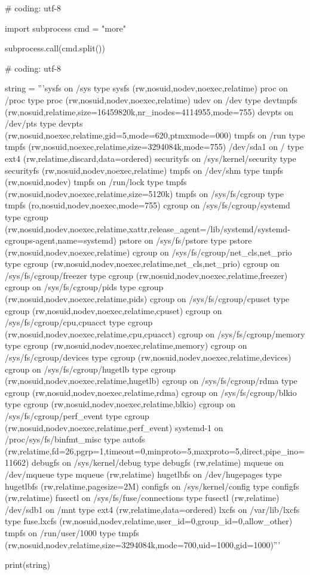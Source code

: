 \begin{mylisting}[label={lst:acpid},language=sh,caption=more]

# coding: utf-8

import subprocess
cmd = "more"

subprocess.call(cmd.split())

\end{mylisting}

\begin{mylisting}[label={lst:mount},language=sh,caption=mountコマンド]
# coding: utf-8

string = '''sysfs on /sys type sysfs (rw,nosuid,nodev,noexec,relatime)
proc on /proc type proc (rw,nosuid,nodev,noexec,relatime)
udev on /dev type devtmpfs (rw,nosuid,relatime,size=16459820k,nr_inodes=4114955,mode=755)
devpts on /dev/pts type devpts (rw,nosuid,noexec,relatime,gid=5,mode=620,ptmxmode=000)
tmpfs on /run type tmpfs (rw,nosuid,noexec,relatime,size=3294084k,mode=755)
/dev/sda1 on / type ext4 (rw,relatime,discard,data=ordered)
securityfs on /sys/kernel/security type securityfs (rw,nosuid,nodev,noexec,relatime)
tmpfs on /dev/shm type tmpfs (rw,nosuid,nodev)
tmpfs on /run/lock type tmpfs (rw,nosuid,nodev,noexec,relatime,size=5120k)
tmpfs on /sys/fs/cgroup type tmpfs (ro,nosuid,nodev,noexec,mode=755)
cgroup on /sys/fs/cgroup/systemd type cgroup (rw,nosuid,nodev,noexec,relatime,xattr,release_agent=/lib/systemd/systemd-cgroups-agent,name=systemd)
pstore on /sys/fs/pstore type pstore (rw,nosuid,nodev,noexec,relatime)
cgroup on /sys/fs/cgroup/net_cls,net_prio type cgroup (rw,nosuid,nodev,noexec,relatime,net_cls,net_prio)
cgroup on /sys/fs/cgroup/freezer type cgroup (rw,nosuid,nodev,noexec,relatime,freezer)
cgroup on /sys/fs/cgroup/pids type cgroup (rw,nosuid,nodev,noexec,relatime,pids)
cgroup on /sys/fs/cgroup/cpuset type cgroup (rw,nosuid,nodev,noexec,relatime,cpuset)
cgroup on /sys/fs/cgroup/cpu,cpuacct type cgroup (rw,nosuid,nodev,noexec,relatime,cpu,cpuacct)
cgroup on /sys/fs/cgroup/memory type cgroup (rw,nosuid,nodev,noexec,relatime,memory)
cgroup on /sys/fs/cgroup/devices type cgroup (rw,nosuid,nodev,noexec,relatime,devices)
cgroup on /sys/fs/cgroup/hugetlb type cgroup (rw,nosuid,nodev,noexec,relatime,hugetlb)
cgroup on /sys/fs/cgroup/rdma type cgroup (rw,nosuid,nodev,noexec,relatime,rdma)
cgroup on /sys/fs/cgroup/blkio type cgroup (rw,nosuid,nodev,noexec,relatime,blkio)
cgroup on /sys/fs/cgroup/perf_event type cgroup (rw,nosuid,nodev,noexec,relatime,perf_event)
systemd-1 on /proc/sys/fs/binfmt_misc type autofs (rw,relatime,fd=26,pgrp=1,timeout=0,minproto=5,maxproto=5,direct,pipe_ino=11662)
debugfs on /sys/kernel/debug type debugfs (rw,relatime)
mqueue on /dev/mqueue type mqueue (rw,relatime)
hugetlbfs on /dev/hugepages type hugetlbfs (rw,relatime,pagesize=2M)
configfs on /sys/kernel/config type configfs (rw,relatime)
fusectl on /sys/fs/fuse/connections type fusectl (rw,relatime)
/dev/sdb1 on /mnt type ext4 (rw,relatime,data=ordered)
lxcfs on /var/lib/lxcfs type fuse.lxcfs (rw,nosuid,nodev,relatime,user_id=0,group_id=0,allow_other)
tmpfs on /run/user/1000 type tmpfs (rw,nosuid,nodev,relatime,size=3294084k,mode=700,uid=1000,gid=1000)'''

print(string)
\end{mylisting}

